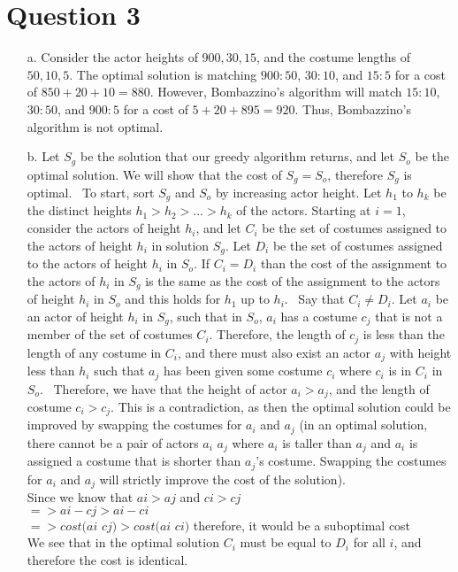 \documentclass[12pt]{article}
\begin{document}
\section*{Question 3} 
\begin{enumerate}
    \item[a.] Consider the actor heights of $900, 30, 15$, and the costume lengths of $50, 10, 5$. The optimal solution is matching $900 : 50$, $30 : 10$, and $15 : 5$ for a cost of $850 + 20 + 10 = 880$. However, Bombazzino's algorithm will match $15 : 10$, $30 : 50$, and $900 : 5$ for a cost of $5 + 20 + 895 = 920$. Thus, Bombazzino's algorithm is not optimal.
    \item[b.] Let $S_g$ be the solution that our greedy algorithm returns, and let $S_o$ be the optimal solution. We will show that the cost of $S_g = S_o$, therefore $S_g$ is optimal.
    \newline \,
    \newline
    To start, sort $S_g$ and $S_o$ by increasing actor height. Let $h_1$ to $h_k$ be the distinct heights $h_1 > h_2 > ... > h_k$ of the actors. Starting at $i = 1$, consider the actors of height $h_i$, and let $C_i$ be the set of costumes assigned to the actors of height $h_i$ in solution $S_g$. Let $D_i$ be the set of costumes assigned to the actors of height $h_i$ in $S_o$. If $C_i = D_i$ than the cost of the assignment to the actors of $h_i$ in $S_g$ is the same as the cost of the assignment to the actors of height $h_i$ in $S_o$ and this holds for $h_1$ up to $h_i$.
    \newline \,
    \newline
    Say that $C_i \neq D_i$. Let $a_i$ be an actor of height $h_i$ in $S_g$, such that in $S_o$, $a_i$ has a costume $c_j$ that is not a member of the set of costumes $C_i$. Therefore, the length of $c_j$ is less than the length of any costume in $C_i$, and there must also exist an actor $a_j$ with height less than $h_i$ such that $a_j$ has been given some costume $c_i$ where $c_i$ is in $C_i$ in $S_o$.
    \newline \,
    \newline
    Therefore, we have that the height of actor $a_i > a_j$, and the length of costume $c_i > c_j$. This is a contradiction, as then the optimal solution could be improved by swapping the costumes for $a_i$ and $a_j$ 
    (in an optimal solution, there cannot be a pair of actors $a_i$ $a_j$ where $a_i$ is taller than $a_j$ and $a_i$ is assigned a costume that is shorter than $a_j$'s costume. Swapping the costumes for $a_i$ and $a_j$ will strictly improve the cost of the solution).\\

    Since we know that $ai > aj$ and $ci > cj$\\
    $=> ai - cj > ai - ci$\\
    $=> cost(ai$ $cj) > cost(ai$ $ci)$ therefore, it would be a suboptimal cost\\

    We see that in the optimal solution $C_i$ must be equal to $D_i$ for all $i$, and therefore the cost is identical.

\end{enumerate}
\end{document}
